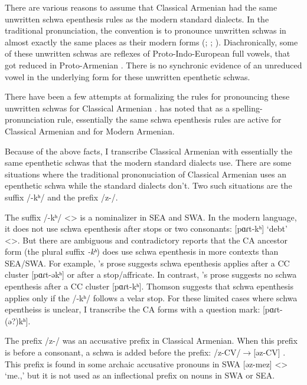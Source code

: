 There are various reasons to assume that Classical Armenian had the same unwritten schwa epenthesis rules as the modern standard dialects. In the traditional pronunciation, the convention is to pronounce unwritten schwas in almost exactly the same places as their modern forms (\citealt[16]{Godel-1975-IntroClassicalArmenian}; \citealt[116]{Thomson-1989-IntroClassicalArmenian}; \citealt[1043]{Macak-2017-PhonoClassicalArmenian}). Diachronically, some of these unwritten schwas are reflexes of Proto-Indo-European full vowels, that got reduced in Proto-Armenian \citep[26]{Vaux-1998-ArmenianPhono}. There is no synchronic evidence of an unreduced vowel in the underlying form for these unwritten epenthetic schwas.

There have been a few attempts at formalizing the rules for pronouncing these unwritten schwas for Classical Armenian \citep{Hammalian-1984-PhonoOldArmenian,Schwink-1994-ArmenianSchwaLexicalized,Pierce-2007-SchwaClassicalArmenian}. \citet{Pierce-2007-SchwaClassicalArmenian} has noted that as a spelling-pronunciation rule, essentially the same schwa epenthesis rules are active for Classical Armenian and for Modern Armenian.

Because of the above facts, I transcribe Classical Armenian with essentially the same epenthetic schwas that the modern standard dialects use. There are some situations where the traditional prononuciation of Classical Armenian   uses an epenthetic schwa while the standard dialects don't. Two such situations are the suffix /-kʰ/ and the prefix /z-/. 

The suffix /-kʰ/ <> is a nominalizer in SEA and SWA. In the modern language, it does not use schwa epenthesis after stops or two consonants: [pɑɾt-kʰ] `debt' <>. But there are ambiguous and contradictory reports that the CA ancestor form (the plural suffix \textit{-kʰ}) does use schwa epenthesis in more contexts than SEA/SWA. For example, \citet[18-19]{Godel-1975-IntroClassicalArmenian}'s prose suggests schwa epenthesis applies after a CC cluster [pɑɾt-əkʰ] or after a stop/affricate. In contrast, \citet[120]{Thomson-1989-IntroClassicalArmenian}'s prose suggests no schwa epenthesis after a CC cluster [pɑɾt-kʰ]. Thomson suggests that schwa epenthesis applies only if the /-kʰ/ follows a velar stop. For these limited cases where schwa epentheiss is unclear, I transcribe the CA forms with a question mark: [pɑɾt-(ə?)kʰ]. 

The prefix /z-/ was an accusative prefix in Classical Armenian. When this prefix is before a consonant, a schwa is added before the prefix: /z-CV/$\rightarrow$[əz-CV] \citep[116]{Thomson-1989-IntroClassicalArmenian}. This prefix   is found in some archaic accusative pronouns in SWA [əz-mez] <> `me.{\acc},' but it is not used as an inflectional prefix on nouns in  SWA or SEA. 




